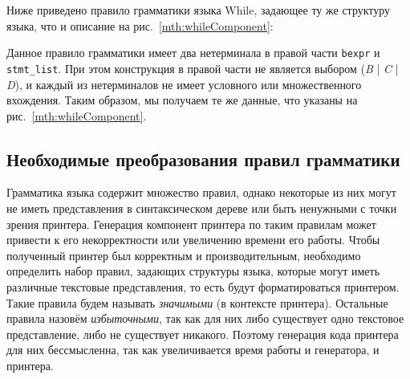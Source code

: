 Ниже приведено правило грамматики языка While, задающее ту же структуру языка, что и описание на рис.~\ref{mth:whileComponent}:
{

}
\noindent
Данное правило грамматики имеет два нетерминала в правой части \lstinline{bexpr} и \lstinline{stmt_list}.
При этом конструкция в правой части не является выбором (\emph B | \emph C | \emph D), и каждый из нетерминалов не имеет условного или множественного вхождения.
Таким образом, мы получаем те же данные, что указаны на рис.~\ref{mth:whileComponent}.

\subsection{Необходимые преобразования правил грамматики}%
Грамматика языка содержит множество правил, однако некоторые из них могут не иметь представления в синтаксическом дереве или быть ненужными с точки зрения принтера.
Генерация компонент принтера по таким правилам может привести к его некорректности или увеличению времени его работы.
Чтобы полученный принтер был корректным и производительным, необходимо определить набор правил, задающих структуры языка, которые могут иметь различные текстовые представления, то есть будут форматироваться принтером.
Такие правила будем называть \emph{значимыми} (в контексте принтера).
Остальные правила назовём \emph{избыточными}, так как для них либо существует одно текстовое представление, либо не существует никакого.
Поэтому генерация кода принтера для них бессмысленна, так как увеличивается время работы и генератора, и принтера.


